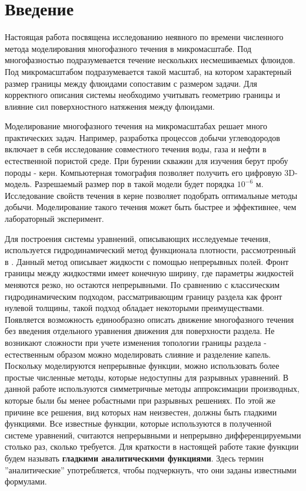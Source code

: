\documentclass[a4paper,12pt]{article}
\begin{document}
\section{Введение}
Настоящая работа посвящена исследованию неявного по времени численного метода моделирования многофазного течения в микромасштабе. Под многофазностью подразумевается течение нескольких несмешиваемых флюидов. Под микромасштабом подразумевается такой масштаб, на котором характерный размер границы между флюидами сопоставим с размером задачи. Для корректного описания системы необходимо учитывать геометрию границы и влияние сил поверхностного натяжения между флюидами.
\par
Моделирование многофазного течения на микромасштабах решает много практических задач. Например, разработка процессов добычи углеводородов включает в себя исследование совместного течения воды, газа и нефти в естественной пористой среде. При бурении скважин для изучения берут пробу породы - керн. Компьютерная томография позволяет получить его цифровую 3D-модель. Разрешаемый размер пор в такой модели будет порядка $10^{-6}$ м.  Исследование свойств течения в керне позволяет подобрать оптимальные методы добычи. Моделирование такого течения может быть быстрее и эффективнее, чем лабораторный эксперимент. 
\par
Для построения системы уравнений, описывающих исследуемые течения, используется гидродинамический метод функционала плотности, рассмотренный в \cite{demyanov, kudinov, dhd_spe}. Данный метод описывает жидкости с помощью непрерывных полей. Фронт границы между жидкостями имеет конечную ширину, где параметры жидкостей меняются резко, но остаются непрерывными. По сравнению с классическим гидродинамическим подходом, рассматривающим границу раздела как фронт нулевой толщины, такой подход обладает некоторыми преимуществами. Появляется возможность единообразно описать движение многофазного течения без введения отдельного уравнения движения для поверхности раздела. Не возникают сложности при учете изменения топологии границы раздела - естественным образом можно моделировать слияние и разделение капель. Поскольку моделируются непрерывные функции, можно использовать более простые численные методы, которые недоступны для разрывных уравнений. В данной работе используются симметричные методы аппроксимации производных, которые были бы менее робастными при разрывных решениях. По этой же причине все решения, вид которых нам неизвестен, должны быть гладкими функциями. Все известные функции, которые используются в полученной системе уравнений, считаются непрерывными и непрерывно дифференцируемыми столько раз, сколько требуется. Для краткости в настоящей работе такие функции будем называть \textbf{гладкими аналитическими функциями}. Здесь термин ''аналитические'' употребляется, чтобы подчеркнуть, что они заданы известными формулами.
\end{document}
